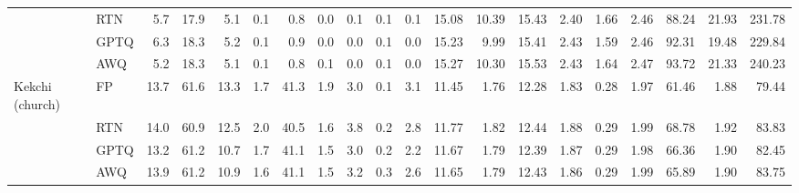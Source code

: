 \begin{landscape}
\begin{longtable}{llrrrrrrrrrrrrrrrrrr}
 & RTN & \cellcolor{loss!31}5.7 & \cellcolor{loss!9}17.9 & 5.1 & \cellcolor{loss!2}0.1 & \cellcolor{loss!3}0.8 & \cellcolor{loss!0}0.0 & \cellcolor{loss!3}0.1 & 0.1 & \cellcolor{loss!3}0.1 & 15.08 & \cellcolor{loss!12}10.39 & \cellcolor{loss!4}15.43 & 2.40 & \cellcolor{loss!17}1.66 & \cellcolor{loss!4}2.46 & 88.24 & \cellcolor{loss!4}21.93 & \cellcolor{loss!16}231.78 \\
 & GPTQ & \cellcolor{loss!22}6.3 & \cellcolor{loss!3}18.3 & 5.2 & \cellcolor{loss!2}0.1 & \cellcolor{loss!1}0.9 & 0.0 & \cellcolor{loss!1}0.0 & 0.1 & \cellcolor{loss!1}0.0 & \cellcolor{loss!0}15.23 & 9.99 & \cellcolor{loss!3}15.41 & \cellcolor{loss!3}2.43 & 1.59 & \cellcolor{loss!3}2.46 & \cellcolor{loss!1}92.31 & 19.48 & \cellcolor{loss!11}229.84 \\
 & AWQ & \cellcolor{loss!39}5.2 & \cellcolor{loss!3}18.3 & 5.1 & \cellcolor{loss!2}0.1 & \cellcolor{loss!3}0.8 & 0.1 & 0.0 & 0.1 & \cellcolor{loss!1}0.0 & \cellcolor{loss!3}15.27 & \cellcolor{loss!7}10.30 & \cellcolor{loss!9}15.53 & \cellcolor{loss!6}2.43 & \cellcolor{loss!8}1.64 & \cellcolor{loss!10}2.47 & \cellcolor{loss!4}93.72 & \cellcolor{loss!2}21.33 & \cellcolor{loss!38}240.23 \\
\midrule
Kekchi (church) & FP & 13.7 & 61.6 & 13.3 & 1.7 & 41.3 & 1.9 & 3.0 & 0.1 & 3.1 & 11.45 & 1.76 & 12.28 & 1.83 & 0.28 & 1.97 & 61.46 & 1.88 & 79.44 \\
 & RTN & 14.0 & \cellcolor{loss!11}60.9 & \cellcolor{loss!11}12.5 & 2.0 & \cellcolor{loss!12}40.5 & \cellcolor{loss!4}1.6 & \cellcolor{loss!20}3.8 & \cellcolor{loss!3}0.2 & 2.8 & \cellcolor{loss!17}11.77 & \cellcolor{loss!3}1.82 & \cellcolor{loss!8}12.44 & \cellcolor{loss!21}1.88 & \cellcolor{loss!4}0.29 & \cellcolor{loss!9}1.99 & \cellcolor{loss!19}68.78 & \cellcolor{loss!0}1.92 & \cellcolor{loss!12}83.83 \\
 & GPTQ & \cellcolor{loss!7}13.2 & \cellcolor{loss!7}61.2 & \cellcolor{loss!38}10.7 & 1.7 & \cellcolor{loss!3}41.1 & \cellcolor{loss!6}1.5 & 3.0 & \cellcolor{loss!3}0.2 & 2.2 & \cellcolor{loss!11}11.67 & \cellcolor{loss!2}1.79 & \cellcolor{loss!6}12.39 & \cellcolor{loss!15}1.87 & \cellcolor{loss!4}0.29 & \cellcolor{loss!5}1.98 & \cellcolor{loss!13}66.36 & \cellcolor{loss!0}1.90 & \cellcolor{loss!8}82.45 \\
 & AWQ & 13.9 & \cellcolor{loss!6}61.2 & \cellcolor{loss!35}10.9 & \cellcolor{loss!2}1.6 & \cellcolor{loss!3}41.1 & \cellcolor{loss!6}1.5 & \cellcolor{loss!5}3.2 & \cellcolor{loss!4}0.3 & 2.6 & \cellcolor{loss!10}11.65 & \cellcolor{loss!1}1.79 & \cellcolor{loss!8}12.43 & \cellcolor{loss!15}1.86 & \cellcolor{loss!4}0.29 & \cellcolor{loss!8}1.99 & \cellcolor{loss!12}65.89 & \cellcolor{loss!0}1.90 & \cellcolor{loss!11}83.75 \\

\end{longtable}
\end{landscape}
